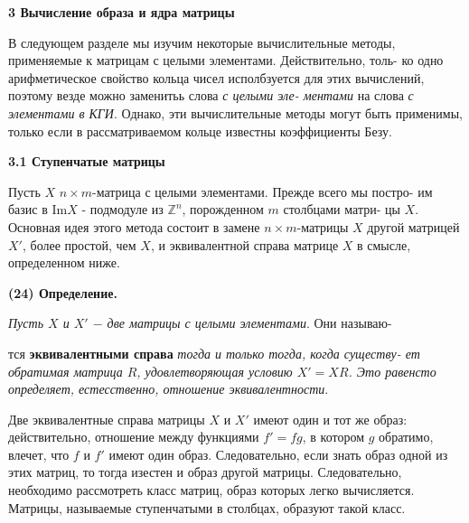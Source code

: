 	\noindent
	{\Large {\bf 3 Вычисление образа и ядра матрицы}}
	
	\noindent
	В следующем разделе мы изучим некоторые вычислительные методы,\linebreak
	применяемые к матрицам с целыми элементами. Действительно, толь-\linebreak
	ко одно арифметическое свойство кольца чисел исполбзуется для\linebreak
	этих вычислений, поэтому везде можно заменитьь слова {\it с целыми эле-\linebreak
	ментами} на слова {\it с элементами в КГИ}. Однако, эти вычислительные\linebreak
	методы могут быть применимы, только если в рассматриваемом кольце\linebreak
	известны коэффициенты Безу.
	
	\noindent
	{\large {\bf 3.1 Ступенчатые матрицы}}
	
	\noindent
	Пусть $X$ $n\times m$-матрица с целыми элементами. Прежде всего мы постро-\linebreak
	им базис в  Im$X$ - подмодуле из ${\mathbb Z}^{n}$, порожденном $m$ столбцами матри-\linebreak
	цы $X$. Основная идея этого метода состоит в замене $n\times m$-матрицы\linebreak
	$X$ другой матрицей $X'$, более простой, чем $X$, и эквивалентной справа\linebreak
	матрице $X$ в смысле, определенном ниже.\newline
	
	\noindent
	{\bf (24) Определение.}
	
	{\it Пусть $X$ и $X'$ $-$ две матрицы с целыми элементами}. Они называю-\linebreak

	\pagebreak
	
	
	\noindent
	тся {\bf эквивалентными справа} {\it тогда и только тогда, когда существу-\linebreak
	ет обратимая матрица $R$, удовлетворяющая условию $X' = XR$. Это\linebreak
	равенсто определяет, естесственно, отношение эквивалентности}.\linebreak

	Две эквивалентные справа матрицы $X$ и $X'$ имеют один и тот же\linebreak
	образ: действительно, отношение между функциями $f' = fg$, в котором\linebreak
	$g$ обратимо, влечет, что $f$ и $f'$ имеют один образ. Следовательно, если\linebreak
	знать образ одной из этих матриц, то тогда изестен и образ другой\linebreak
	матрицы. Следовательно, необходимо рассмотреть класс матриц, образ\linebreak
	которых легко вычисляется. Матрицы, называемые ступенчатыми в\linebreak
	столбцах, образуют такой класс.
	
